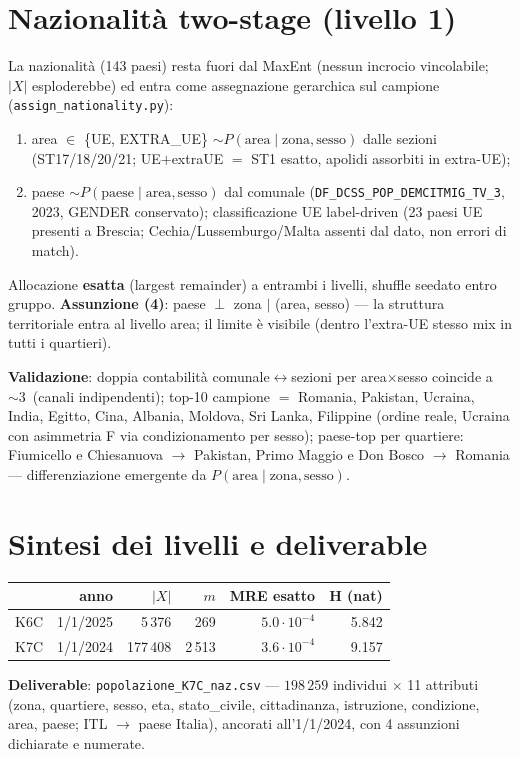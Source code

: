\documentclass[11pt,a4paper]{article}
\newcommand{\code}[1]{\texttt{#1}}
\newcommand{\flow}[1]{\texttt{\small #1}}
\begin{document}
\section{Nazionalit\`a two-stage (livello 1)}
\label{sec:naz}
La nazionalit\`a (143 paesi) resta fuori dal MaxEnt (nessun incrocio
vincolabile; $|X|$ esploderebbe) ed entra come assegnazione gerarchica sul
campione (\code{assign\_nationality.py}):
\begin{enumerate}[leftmargin=*,itemsep=1pt]
  \item[(2a)] area $\in$ \{UE, EXTRA\_UE\} $\sim P(\text{area}\mid
  \text{zona},\text{sesso})$ dalle sezioni (ST17/18/20/21; UE$+$extraUE
  $=$ ST1 esatto, apolidi assorbiti in extra-UE);
  \item[(2b)] paese $\sim P(\text{paese}\mid\text{area},\text{sesso})$ dal
  comunale (\flow{DF\_DCSS\_POP\_DEMCITMIG\_TV\_3}, 2023, GENDER
  conservato); classificazione UE label-driven (23 paesi UE presenti a
  Brescia; Cechia/Lussemburgo/Malta assenti dal dato, non errori di match).
\end{enumerate}
Allocazione \textbf{esatta} (largest remainder) a entrambi i livelli, shuffle
seedato entro gruppo. \textbf{Assunzione (4)}: paese $\perp$ zona $\mid$
(area, sesso) --- la struttura territoriale entra al livello area; il limite
\`e visibile (dentro l'extra-UE stesso mix in tutti i quartieri).

\medskip\noindent\textbf{Validazione}: doppia contabilit\`a
comunale$\leftrightarrow$sezioni per area$\times$sesso coincide a
$\sim3$\textperthousand\ (canali indipendenti); top-10 campione $=$
Romania, Pakistan, Ucraina, India, Egitto, Cina, Albania, Moldova, Sri
Lanka, Filippine (ordine reale, Ucraina con asimmetria F via
condizionamento per sesso); paese-top per quartiere: Fiumicello e
Chiesanuova $\to$ Pakistan, Primo Maggio e Don Bosco $\to$ Romania ---
differenziazione emergente da $P(\text{area}\mid\text{zona},\text{sesso})$.

\section{Sintesi dei livelli e deliverable}
\begin{center}
\small
\begin{tabular}{@{}lrrrrr@{}}
\toprule
 & \textbf{anno} & $|X|$ & $m$ & \textbf{MRE esatto} & \textbf{H (nat)}\\
\midrule
K6C & 1/1/2025 & 5\,376 & 269 & $5.0\cdot10^{-4}$ & 5.842\\
K7C & 1/1/2024 & 177\,408 & 2\,513 & $3.6\cdot10^{-4}$ & 9.157\\
\bottomrule
\end{tabular}
\end{center}
\noindent\textbf{Deliverable}: \code{popolazione\_K7C\_naz.csv} ---
$198\,259$ individui $\times$ 11 attributi (zona, quartiere, sesso, eta,
stato\_civile, cittadinanza, istruzione, condizione, area, paese; ITL $\to$
paese Italia), ancorati all'1/1/2024, con 4 assunzioni dichiarate e
numerate.
\end{document}
